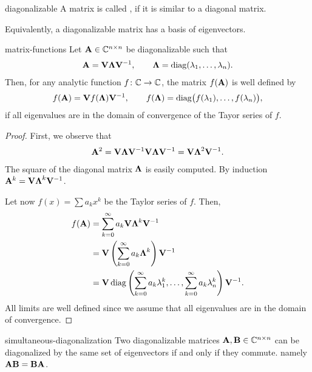 \begin{Definition}{diagonalizable}
  A matrix is called , if it is similar to a diagonal matrix.
  
  Equivalently, a diagonalizable matrix has a basis of eigenvectors.
\end{Definition}

\begin{Theorem}{matrix-functions}
  Let $\mathbf A\in \mathbb C^{n\times n}$ be diagonalizable such that
  \begin{gather}
    \mathbf A = \mathbf V \boldsymbol\Lambda \mathbf V^{-1},
    \qquad \boldsymbol\Lambda = \operatorname{diag}(\lambda_1,\dots,\lambda_n).
  \end{gather}
  Then, for any analytic function $f\colon \mathbb C \to \mathbb C$, the matrix
  $f(\mathbf A)$ is well defined by
  \begin{gather}
    f(\mathbf A) = \mathbf V f(\boldsymbol\Lambda) \mathbf V^{-1},
    \qquad f(\boldsymbol\Lambda) = \operatorname{diag}\bigl(f(\lambda_1),\dots,f(\lambda_n)\bigr),
  \end{gather}
  if all eigenvalues are in the domain of convergence of the Tayor
  series of $f$.
\end{Theorem}

\begin{proof}
  First, we observe that
  \begin{gather}
    \mathbf A^2 = \mathbf V \boldsymbol\Lambda \mathbf V^{-1} \mathbf V \boldsymbol\Lambda \mathbf V^{-1}
    = \mathbf V \boldsymbol\Lambda^2 \mathbf V^{-1}.
  \end{gather}
  The square of the diagonal matrix $\boldsymbol\Lambda$ is easily computed.
  By induction $\mathbf A^k =  \mathbf V \boldsymbol\Lambda^k \mathbf V^{-1}$.

  Let now $f(x) = \sum a_k x^k$ be the Taylor series of $f$. Then,
  \begin{gather}
    \begin{split}
      f(\mathbf A)
      &= \sum_{k=0}^\infty a_k  \mathbf V \boldsymbol\Lambda^k \mathbf V^{-1}\\
      &= \mathbf V \left(\sum_{k=0}^\infty a_k \boldsymbol\Lambda^k\right) \mathbf V^{-1}\\
      &= \mathbf V \operatorname{diag}\left(
        \sum_{k=0}^\infty a_k \lambda_1^k,\dots,
        \sum_{k=0}^\infty a_k\lambda_n^k
      \right)  \mathbf V^{-1}.
    \end{split}
  \end{gather}
  All limits are well defined since we assume that all eigenvalues are
  in the domain of convergence.
\end{proof}

\begin{Theorem}{simultaneous-diagonalization}
  Two diagonalizable matrices $\mathbf A, \mathbf B\in \mathbb C^{n\times n}$ can be
  diagonalized by the same set of eigenvectors if and only if they
  commute. namely $\mathbf A\mathbf B = \mathbf B\mathbf A$.
\end{Theorem}

